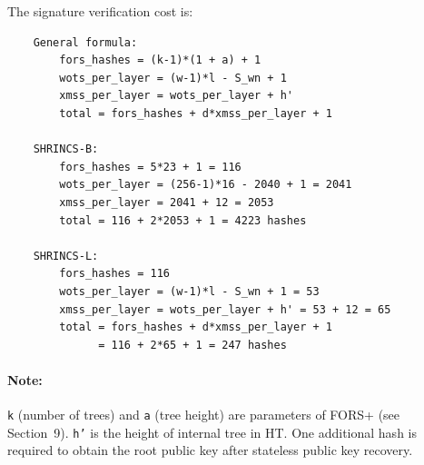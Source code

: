 The signature verification cost is:
\begin{verbatim}
    General formula:
        fors_hashes = (k-1)*(1 + a) + 1
        wots_per_layer = (w-1)*l - S_wn + 1
        xmss_per_layer = wots_per_layer + h'
        total = fors_hashes + d*xmss_per_layer + 1

    SHRINCS-B:
        fors_hashes = 5*23 + 1 = 116
        wots_per_layer = (256-1)*16 - 2040 + 1 = 2041
        xmss_per_layer = 2041 + 12 = 2053
        total = 116 + 2*2053 + 1 = 4223 hashes

    SHRINCS-L:
        fors_hashes = 116
        wots_per_layer = (w-1)*l - S_wn + 1 = 53
        xmss_per_layer = wots_per_layer + h' = 53 + 12 = 65
        total = fors_hashes + d*xmss_per_layer + 1
              = 116 + 2*65 + 1 = 247 hashes
\end{verbatim}

\paragraph{Note:} \texttt{k} (number of trees) and \texttt{a} (tree height) are parameters of FORS+ (see Section~9). \texttt{h'} is the height of internal tree in HT. One additional hash is required to obtain the root public key after stateless public key recovery. 